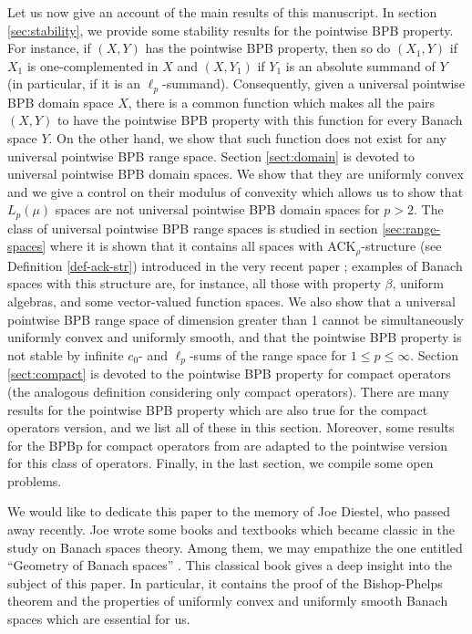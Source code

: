 \documentclass[a4paper,10pt]{amsart}
\theoremstyle{plain}
\theoremstyle{definition}
\renewcommand{\leq}{\leqslant}
\begin{document}
Let us now give an account of the main results of this manuscript. In section \ref{sec:stability}, we provide some stability results for the pointwise BPB property. For instance, if $(X,Y)$ has the pointwise BPB property, then so do $(X_1,Y)$ if $X_1$ is one-complemented in $X$ and $(X,Y_1)$ if $Y_1$ is an absolute summand of $Y$ (in particular, if it is an $\ell_p$-summand). Consequently, given a universal pointwise BPB domain space $X$, there is a common function which makes all the pairs $(X,Y)$ to have the pointwise BPB property with this function for every Banach space $Y$. On the other hand, we show that such  function does not exist for any universal pointwise BPB range space. Section \ref{sect:domain} is devoted to universal pointwise BPB domain spaces. We show that they are uniformly convex and we give a control on their modulus of convexity which allows us to show that $L_p(\mu)$ spaces are not universal pointwise BPB domain spaces for $p>2$. The class of universal pointwise BPB range spaces is studied in section \ref{sec:range-spaces} where it is shown that it contains all spaces with ACK$_\rho$-structure (see Definition \ref{def-ack-str}) introduced in the very recent paper \cite{CGKS}; examples of Banach spaces with this structure are, for instance, all those with property $\beta$, uniform algebras, and some vector-valued function spaces. We also show that a universal pointwise BPB range space of dimension greater than 1 cannot be simultaneously uniformly convex and uniformly smooth, and that the pointwise BPB property is not stable by infinite $c_0$- and $\ell_p$-sums of the range space for $1\leq p \leq \infty$. Section \ref{sect:compact} is devoted to the pointwise BPB property for compact operators (the analogous definition considering only compact operators). There are many results for the pointwise BPB property which are also true for the compact operators version, and we list all of these in this section. Moreover, some results for the BPBp for compact operators from \cite{DGMM} are adapted to the pointwise version for this class of operators. Finally, in the last section, we compile some open problems.

We would like to dedicate this paper to the memory of Joe Diestel, who passed away recently. Joe wrote some books and textbooks which became classic in the study on Banach spaces theory. Among them, we may empathize the one entitled ``Geometry of Banach spaces'' \cite{Diestel}. This classical book gives a deep insight into the subject of this paper. In particular, it contains the proof of the Bishop-Phelps theorem and the properties of uniformly convex and uniformly smooth Banach spaces which are essential for us.
\end{document}
